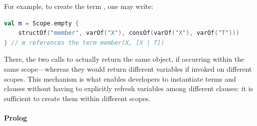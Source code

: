 \documentclass[12pt,a4paper,openright,twoside]{book}
\begin{document}
For example, to create the term , one may write:
%
\begin{lstlisting}[language=Kotlin]
val m = Scope.empty {
    structOf("member", varOf("X"), consOf(varOf("X"), varOf("T")))
} // m references the term member(X, [X | T])
\end{lstlisting}
%
There, the two calls to  actually return the same object, if occurring within the same scope---whereas they would return different variables if invoked on different scopes.
%
This mechanism is what enables developers to instantiate terms and clauses without having to explicitly refresh variables among different clauses: it is sufficient to create them within different scopes.

\paragraph{Prolog}
\end{document}
